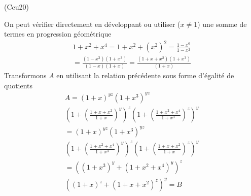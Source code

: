 \begin{tiny}(Ccu20)\end{tiny} On peut vérifier directement en développant ou utiliser ($x\neq 1$) une somme de termes en progression géométrique
\begin{multline*}
  1+x^2+x^4 = 1+x^2+(x^2)^2 = \frac{1-x^6}{1-x^2}\\
  =\frac{(1-x^3)(1+x^3)}{(1-x)(1+x)}
  = \frac{(1+x+x^2)(1+x^3)}{(1+x)}
\end{multline*}
Transformons $A$ en utilisant la relation précédente sous forme d'égalité de quotients
\begin{multline*}
A
= (1+x)^{yz}(1+x^3)^{yz}\\
\left( 1 + \left( \frac{1+x+x^2}{1+x}\right)^y \right)^z 
\left( 1 + \left( \frac{1+x^2+x^4}{1+x^3}\right)^z \right)^y\\
= (1+x)^{yz}(1+x^3)^{yz}\\
\left( 1 + \left( \frac{1+x^2+x^4}{1+x^3}\right)^y \right)^z 
\left( 1 + \left( \frac{1+x+x^2}{1+x}\right)^z \right)^y\\
=
\left( (1+x^3)^y + (1+x^2+x^4)^y \right)^z \\
\left( (1+x)^z + (1+x+x^2)^z \right)^y
= B
\end{multline*}
